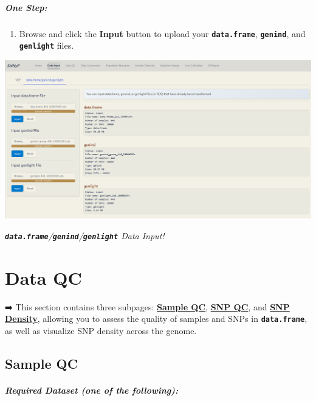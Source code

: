 \documentclass[
]{book}
\providecommand{\tightlist}{%
  \setlength{\itemsep}{0pt}\setlength{\parskip}{0pt}}
\begin{document}
\paragraph*{\texorpdfstring{\textbf{One Step:}}{One Step:}}\label{one-step}

\begin{enumerate}
\def\labelenumi{\arabic{enumi}.}
\tightlist
\item
  {Browse} and click the {\textbf{Input}} button to upload your {\textbf{\texttt{data.frame}}}, {\textbf{\texttt{genind}}}, and {\textbf{\texttt{genlight}}} files.
\end{enumerate}

\includegraphics[width=8.33333in,height=\textheight]{images/圖片17.png}

{\textbf{\emph{\texttt{data.frame}}}}\emph{/{\textbf{\texttt{genind}}}/{\textbf{\texttt{genlight}}} Data Input!}

\chapter{Data QC}\label{sec-data-qc}

➡️ This section contains three subpages: \ul{\textbf{Sample QC}}, \ul{\textbf{SNP QC}}, and \ul{\textbf{SNP Density}}, allowing you to assess the quality of samples and SNPs in {\textbf{\texttt{data.frame}}}, as well as visualize SNP density across the genome.

\section{Sample QC}\label{sample-qc}

\paragraph*{Required Dataset (one of the following):}\label{required-dataset-one-of-the-following-1}
\end{document}
